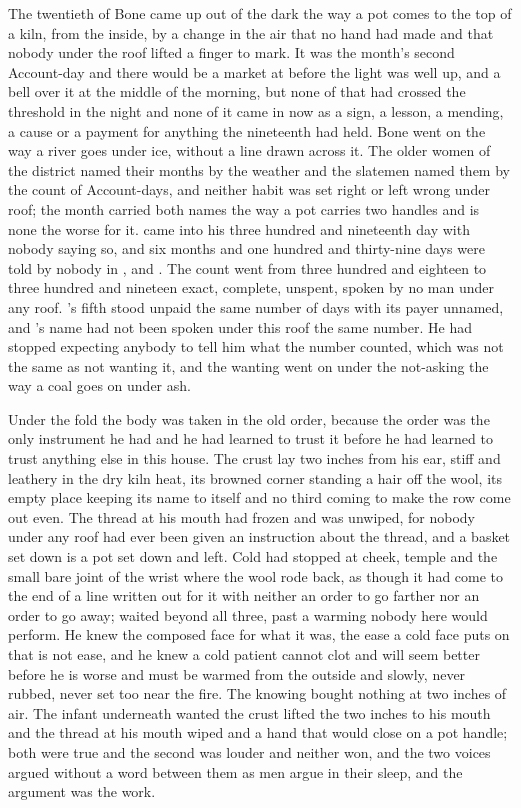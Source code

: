 
The twentieth of Bone came up out of the dark the way a pot comes to the top of a kiln, from the inside, by a change in the air that no hand had made and that nobody under the roof lifted a finger to mark. It was the month's second Account-day and there would be a market at  before the light was well up, and a bell over it at the middle of the morning, but none of that had crossed the threshold in the night and none of it came in now as a sign, a lesson, a mending, a cause or a payment for anything the nineteenth had held. Bone went on the way a river goes under ice, without a line drawn across it. The older women of the district named their months by the weather and the slatemen named them by the count of Account-days, and neither habit was set right or left wrong under  roof; the month carried both names the way a pot carries two handles and is none the worse for it.  came into his three hundred and nineteenth day with nobody saying so, and six months and one hundred and thirty-nine days were told by nobody in ,  and . The count went from three hundred and eighteen to three hundred and nineteen exact, complete, unspent, spoken by no man under any roof. 's fifth stood unpaid the same number of days with its payer unnamed, and 's name had not been spoken under this roof the same number. He had stopped expecting anybody to tell him what the number counted, which was not the same as not wanting it, and the wanting went on under the not-asking the way a coal goes on under ash.

Under the fold the body was taken in the old order, because the order was the only instrument he had and he had learned to trust it before he had learned to trust anything else in this house. The crust lay two inches from his ear, stiff and leathery in the dry kiln heat, its browned corner standing a hair off the wool, its empty place keeping its name to itself and no third coming to make the row come out even. The thread at his mouth had frozen and was unwiped, for nobody under any roof had ever been given an instruction about the thread, and a basket set down is a pot set down and left. Cold had stopped at cheek, temple and the small bare joint of the wrist where the wool rode back, as though it had come to the end of a line written out for it with neither an order to go farther nor an order to go away;  waited beyond all three, past a warming nobody here would perform. He knew the composed face for what it was, the ease a cold face puts on that is not ease, and he knew a cold patient cannot clot and will seem better before he is worse and must be warmed from the outside and slowly, never rubbed, never set too near the fire. The knowing bought nothing at two inches of air. The infant underneath wanted the crust lifted the two inches to his mouth and the thread at his mouth wiped and a hand that would close on a pot handle; both were true and the second was louder and neither won, and the two voices argued without a word between them as men argue in their sleep, and the argument was the work.


